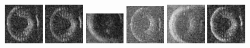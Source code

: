 \begin{figure}
    \includegraphics[width=0.15\textwidth]{chapters/images/dataset/all-class-images/tire/tire-247.jpg}
    \includegraphics[width=0.15\textwidth]{chapters/images/dataset/all-class-images/tire/tire-231.jpg}
    \includegraphics[width=0.15\textwidth]{chapters/images/dataset/all-class-images/tire/tire-33.jpg}
    \includegraphics[width=0.15\textwidth]{chapters/images/dataset/all-class-images/tire/tire-4.jpg}
    \includegraphics[width=0.15\textwidth]{chapters/images/dataset/all-class-images/tire/tire-20.jpg}
    \includegraphics[width=0.15\textwidth]{chapters/images/dataset/all-class-images/tire/tire-287.jpg}
    

\end{figure}
